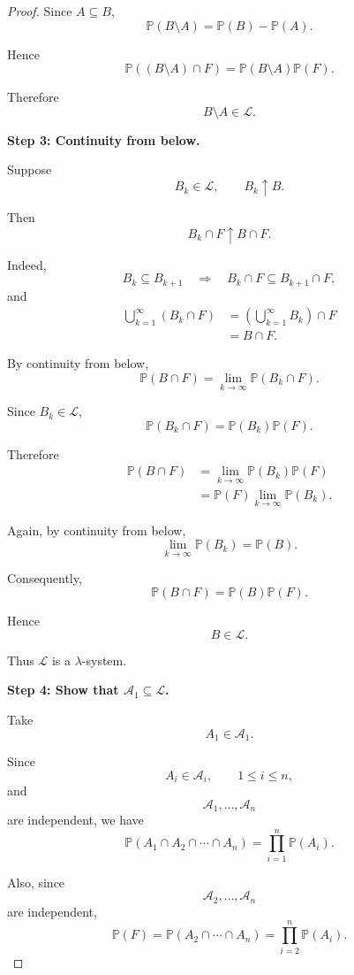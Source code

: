 \begin{proof}
Since $A\subseteq B$,
\[
\mathbb{P}(B\setminus A)
=
\mathbb{P}(B)-\mathbb{P}(A).
\]

Hence
\[
\mathbb{P}((B\setminus A)\cap F)
=
\mathbb{P}(B\setminus A)\mathbb{P}(F).
\]

Therefore
\[
B\setminus A\in\mathcal{L}.
\]

\medskip

\textbf{Step 3: Continuity from below.}

Suppose
\[
B_k\in\mathcal{L},
\qquad
B_k\uparrow B.
\]

Then
\[
B_k\cap F\uparrow B\cap F.
\]

Indeed,
\[
B_k\subseteq B_{k+1}
\quad\Longrightarrow\quad
B_k\cap F\subseteq B_{k+1}\cap F,
\]
and
\[
\begin{aligned}
\bigcup_{k=1}^{\infty}(B_k\cap F)
&=
\left(\bigcup_{k=1}^{\infty}B_k\right)\cap F\\
&=
B\cap F.
\end{aligned}
\]

By continuity from below,
\[
\mathbb{P}(B\cap F)
=
\lim_{k\to\infty}
\mathbb{P}(B_k\cap F).
\]

Since $B_k\in\mathcal{L}$,
\[
\mathbb{P}(B_k\cap F)
=
\mathbb{P}(B_k)\mathbb{P}(F).
\]

Therefore
\[
\begin{aligned}
\mathbb{P}(B\cap F)
&=
\lim_{k\to\infty}
\mathbb{P}(B_k)\mathbb{P}(F)\\
&=
\mathbb{P}(F)
\lim_{k\to\infty}\mathbb{P}(B_k).
\end{aligned}
\]

Again, by continuity from below,
\[
\lim_{k\to\infty}\mathbb{P}(B_k)
=
\mathbb{P}(B).
\]

Consequently,
\[
\mathbb{P}(B\cap F)
=
\mathbb{P}(B)\mathbb{P}(F).
\]

Hence
\[
B\in\mathcal{L}.
\]

Thus $\mathcal{L}$ is a $\lambda$-system.

\medskip

\textbf{Step 4: Show that $\mathcal{A}_1\subseteq\mathcal{L}$.}

Take
\[
A_1\in\mathcal{A}_1.
\]

Since
\[
A_i\in\mathcal{A}_i,
\qquad
1\leq i\leq n,
\]
and
\[
\mathcal{A}_1,\ldots,\mathcal{A}_n
\]
are independent, we have
\[
\mathbb{P}(A_1\cap A_2\cap\cdots\cap A_n)
=
\prod_{i=1}^{n}\mathbb{P}(A_i).
\]

Also, since
\[
\mathcal{A}_2,\ldots,\mathcal{A}_n
\]
are independent,
\[
\mathbb{P}(F)
=
\mathbb{P}(A_2\cap\cdots\cap A_n)
=
\prod_{i=2}^{n}\mathbb{P}(A_i).
\]


\end{proof}
